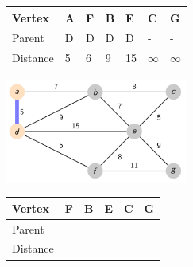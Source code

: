 \documentclass{beamer}
\begin{document}
\begin{frame}[fragile]
    \centering
    \begin{table}[]
        \begin{tabular}{|l|l|l|l|l|l|l|}
            \hline
            Vertex   & A & F & B & E  & C        & G        \\ \hline
            Parent   & D & D & D & D  & -        & -        \\ \hline
            Distance & 5 & 6 & 9 & 15 & $\infty$ & $\infty$ \\ \hline
        \end{tabular}
    \end{table}
    \includegraphics[width=0.45\textwidth]{./imgs/dijkstra_walkthrough/dijkstra-2.png}
    \begin{table}[]
        \begin{tabular}{|l|l|l|l|l|l|}
            \hline
            Vertex   & F & B & E  & C        & G        \\ \hline
            Parent   &  &  &     &         &         \\ \hline
            Distance &  &  &  &  & \\ \hline
        \end{tabular}
    \end{table}
\end{frame}
\end{document}
